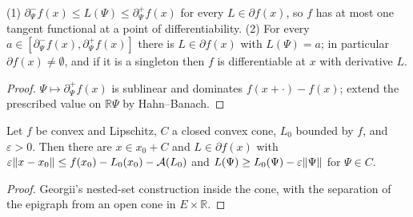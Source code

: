 \begin{theorem}[Georgii (16.6)]
    \label{thm:tf-16-6}
    \leanok

    (1) $\partial^-_\Psi f(x) \leq L(\Psi) \leq \partial^+_\Psi f(x)$ for every $L \in \partial f(x)$,
    so $f$ has at most one tangent functional at a point of differentiability. (2) For every
    $a \in [\partial^-_\Psi f(x), \partial^+_\Psi f(x)]$ there is $L \in \partial f(x)$ with
    $L(\Psi) = a$; in particular $\partial f(x) \neq \emptyset$, and if it is a singleton then $f$
    is differentiable at $x$ with derivative $L$.
\end{theorem}
\begin{proof}
    \leanok
    $\Psi \mapsto \partial^+_\Psi f(x)$ is sublinear and dominates $f(x + \cdot) - f(x)$; extend
    the prescribed value on $\mathbb R\Psi$ by Hahn--Banach.
\end{proof}

\begin{theorem}
    \label{thm:tf-16-7}
    \leanok

    Let $f$ be convex and Lipschitz, $C$ a closed convex cone, $L_0$ bounded by $f$, and
    $\varepsilon > 0$. Then there are $x \in x_0 + C$ and $L \in \partial f(x)$ with
    $\varepsilon\lVert x - x_0\rVert \leq f(x_0) - L_0(x_0) - \mathcal A(L_0)$ and
    $L(\Psi) \geq L_0(\Psi) - \varepsilon\lVert \Psi\rVert$ for $\Psi \in C$.
\end{theorem}
\begin{proof}
    \leanok
    Georgii's nested-set construction inside the cone, with the separation of the epigraph from an
    open cone in $E \times \mathbb R$.
\end{proof}
